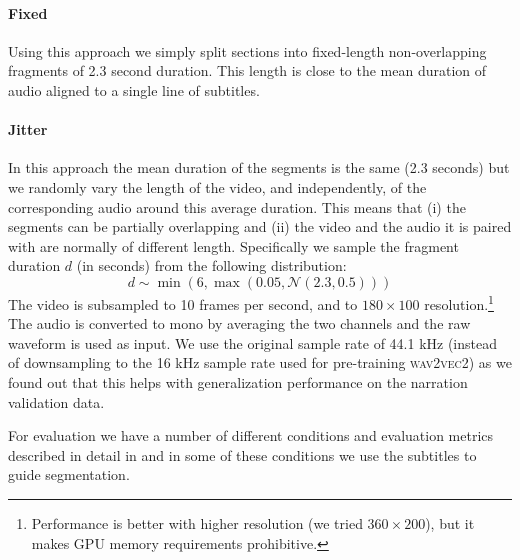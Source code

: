 \paragraph{Fixed} Using this approach we simply split sections into
fixed-length non-overlapping fragments of 2.3 second duration. This
length is close to the mean duration of audio aligned to a single line
of subtitles.

\paragraph{Jitter} In this approach the mean duration of the segments
is the same (2.3 seconds) but we randomly vary the length of the
video, and independently, of the corresponding audio around this
average duration. This means that (i) the segments can be partially
overlapping and (ii) the video and the audio it is paired with are
normally of different length. Specifically we sample the fragment
duration $d$ (in seconds)
from the following distribution:
\begin{equation}
  d \sim \min(6, \max(0.05, \mathcal{N}(2.3, 0.5)))
  \label{eq:jitter}
\end{equation}
The video is subsampled to 10 frames per second, and to
$180\times 100$ resolution.\footnote{Performance is better with higher
  resolution (we tried $360\times 200$), but it makes GPU memory
  requirements prohibitive.}  The audio is converted to mono by
averaging the two channels and the raw waveform is used as input. We
use the original sample rate of 44.1 kHz (instead of downsampling to
the 16 kHz sample rate used for pre-training \textsc{wav2vec2}) as we
found out that this helps with generalization performance on the
narration validation data.

For evaluation we have a number of different conditions and evaluation
metrics described in detail in  and in some of these
conditions we use the subtitles to guide
segmentation. 

